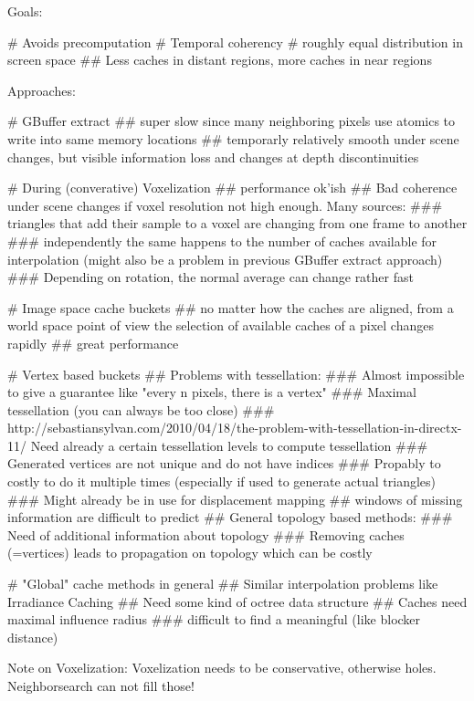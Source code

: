 \documentclass[thesis.tex]{subfiles}
\begin{document}
Goals:
\begin{easylist}[itemize]
# Avoids precomputation
# Temporal coherency
# roughly equal distribution in screen space
## Less caches in distant regions, more caches in near regions
\end{easylist}
Approaches:
\begin{easylist}[itemize]
# GBuffer extract
## super slow since many neighboring pixels use atomics to write into same memory locations
## temporarly relatively smooth under scene changes, but visible information loss and changes at depth discontinuities

# During (converative) Voxelization
## performance ok'ish
## Bad coherence under scene changes if voxel resolution not high enough. Many sources:
### triangles that add their sample to a voxel are changing from one frame to another
### independently the same happens to the number of caches available for interpolation (might also be a problem in previous GBuffer extract approach)
### Depending on rotation, the normal average can change rather fast

# Image space cache buckets
## no matter how the caches are aligned, from a world space point of view the selection of available caches of a pixel changes rapidly
## great performance

# Vertex based buckets
## Problems with tessellation:
### Almost impossible to give a guarantee like "every n pixels, there is a vertex"
### Maximal tessellation (you can always be too close)
### http://sebastiansylvan.com/2010/04/18/the-problem-with-tessellation-in-directx-11/
Need already a certain tessellation levels to compute tessellation
### Generated vertices are not unique and do not have indices
### Propably to costly to do it multiple times (especially if used to generate actual triangles)
### Might already be in use for displacement mapping
## windows of missing information are difficult to predict
## General topology based methods:
### Need of additional information about topology
### Removing caches (=vertices) leads to propagation on topology which can be costly

# "Global" cache methods in general
## Similar interpolation problems like Irradiance Caching
## Need some kind of octree data structure
## Caches need maximal influence radius
### difficult to find a meaningful (like blocker distance)

\end{easylist}

Note on Voxelization: Voxelization needs to be conservative, otherwise holes. Neighborsearch can not fill those!
\end{document}
